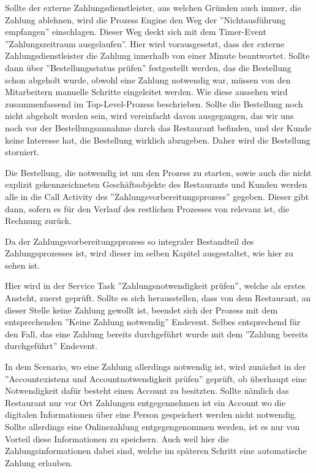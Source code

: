 Sollte der externe Zahlungsdienstleister, aus welchen Gründen auch immer, die Zahlung ablehnen, wird die Prozess Engine den Weg der ''Nichtausführung empfangen'' einschlagen. Dieser Weg deckt sich mit dem Timer-Event ''Zahlungszeitraum ausgelaufen''. Hier wird vorausgesetzt, dass der externe Zahlungsdienstleister die Zahlung innerhalb von einer Minute beantwortet. Sollte dann über ''Bestellungsstatus prüfen'' festgestellt werden, das die Bestellung schon abgeholt wurde, obwohl eine Zahlung notwendig war, müssen von den Mitarbeitern manuelle Schritte eingeleitet werden. Wie diese aussehen wird zusammenfassend im Top-Level-Prozess beschrieben. Sollte die Bestellung noch nicht abgeholt worden sein, wird vereinfacht davon ausgegangen, das wir uns noch vor der Bestellungsannahme durch das Restaurant befinden, und der Kunde keine Interesse hat, die Bestellung wirklich abzugeben. Daher wird die Bestellung storniert. 

Die Bestellung, die notwendig ist um den Prozess zu starten, sowie auch die nicht explizit gekennzeichneten Geschäftsobjekte des Restaurants und Kunden werden alle in die Call Activity des ''Zahlungsvorbereitungsprozess'' gegeben. Dieser gibt dann, sofern es für den Verlauf des restlichen Prozesses von relevanz ist, die Rechnung zurück. 

\clearpage
{}
Da der Zahlungsvorbereitungsprozess so integraler Bestandteil des Zahlungsprozesses ist, wird dieser im selben Kapitel ausgestaltet, wie hier zu sehen ist.

Hier wird in der Service Task ''Zahlungsnotwendigkeit prüfen'', welche als erstes Ansteht, zuerst geprüft. Sollte es sich herausstellen, dass von dem Restaurant, an dieser Stelle keine Zahlung gewollt ist, beendet sich der Prozess mit dem entsprechenden ''Keine Zahlung notwendig'' Endevent. Selbes entsprechend für den Fall, das eine Zahlung bereits durchgeführt wurde mit dem ''Zahlung bereits durchgeführt'' Endevent.

In dem Scenario, wo eine Zahlung allerdings notwendig ist, wird zunächst in der ''Accountexistenz und Accountnotwendigkeit prüfen'' geprüft, ob überhaupt eine Notwendigkeit dafür besteht einen Account zu besitzten. Sollte nämlich das Restaurant nur vor Ort Zahlungen entgegennehmen ist ein Account wo die digitalen Informationen über eine Person gespeichert werden nicht notwendig. Sollte allerdings eine Onlinezahlung entgegengenommen werden, ist es nur von Vorteil diese Informationen zu speichern. Auch weil hier die Zahlungsinformationen dabei sind, welche im späteren Schritt eine automatische Zahlung erlauben.

